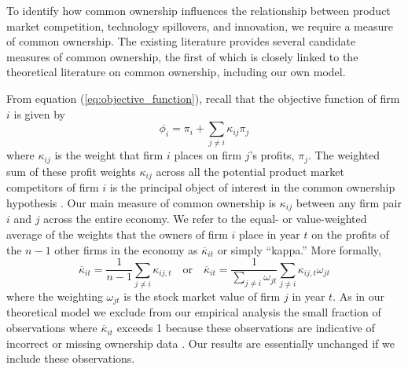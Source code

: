 \documentclass[12pt]{article}
\begin{document}

To identify how common ownership influences the relationship between product market competition, technology spillovers, and innovation, we require a measure of common ownership. The existing literature provides several candidate measures of common ownership, the first of which is closely linked to the theoretical literature on common ownership, including our own model. 

From equation (\ref{eq:objective_function}), recall that the objective function of firm $i$ is given by
\begin{equation*}
\phi_{i} = \pi_{i} + \sum_{j \neq i} \kappa_{ij} \pi_j
\end{equation*}
where $\kappa_{ij}$ is the weight that firm $i$ places on firm $j$'s profits, $\pi_j$. The weighted sum of these profit weights $\kappa_{ij}$ across all the potential product market competitors of firm $i$ is the principal object of interest in the common ownership hypothesis \citep{backus2021common}. Our main measure of common ownership is $\kappa_{ij}$ between any firm pair $i$ and $j$ across the entire economy. We refer to the equal- or value-weighted average of the weights that the owners of firm $i$ place in year $t$ on the profits of the $n-1$ other firms in the economy as $\overline{\kappa}_{it}$ or simply ``kappa.'' More formally,
\begin{equation}
\overline{\kappa}_{it} = \frac{1}{n-1}\sum_{j \neq i} \kappa_{ij,t} \quad \textrm{or} \quad \overline{\kappa}_{it} = \frac{1}{\sum_{j \neq i} \omega_{jt}} \sum_{j \neq i} \kappa_{ij,t} \omega_{jt}
\end{equation}
where the weighting $\omega_{jt}$ is the stock market value of firm $j$ in year $t$. As in our theoretical model we exclude from our empirical analysis the small fraction of observations where $\overline{\kappa}_{it}$ exceeds 1 because these observations are indicative of incorrect or missing ownership data \citep{backus2021common}. Our results are essentially unchanged if we include these observations.
\end{document}
